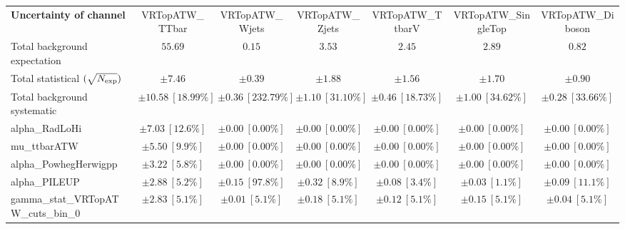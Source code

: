 
\begin{sidewaystable}
\begin{center}
\setlength{\tabcolsep}{0.0pc}
\begin{tabular*}{\textwidth}{@{\extracolsep{\fill}}lcccccc}
\noalign{\smallskip}\hline\noalign{\smallskip}
{\bf Uncertainty of channel}                                    & VRTopATW\_TTbar            & VRTopATW\_Wjets            & VRTopATW\_Zjets            & VRTopATW\_TtbarV            & VRTopATW\_SingleTop            & VRTopATW\_Diboson            \\
\noalign{\smallskip}\hline\noalign{\smallskip}
Total background expectation             &  $55.69$        &  $0.15$        &  $3.53$        &  $2.45$        &  $2.89$        &  $0.82$       \\
\noalign{\smallskip}\hline\noalign{\smallskip}
Total statistical $(\sqrt{N_{\rm exp}})$              & $\pm 7.46$        & $\pm 0.39$        & $\pm 1.88$        & $\pm 1.56$        & $\pm 1.70$        & $\pm 0.90$       \\
Total background systematic               & $\pm 10.58\ [18.99\%] $        & $\pm 0.36\ [232.79\%] $        & $\pm 1.10\ [31.10\%] $        & $\pm 0.46\ [18.73\%] $        & $\pm 1.00\ [34.62\%] $        & $\pm 0.28\ [33.66\%] $             \\
\noalign{\smallskip}\hline\noalign{\smallskip}
\noalign{\smallskip}\hline\noalign{\smallskip}
alpha\_RadLoHi         & $\pm 7.03\ [12.6\%] $          & $\pm 0.00\ [0.00\%] $          & $\pm 0.00\ [0.00\%] $          & $\pm 0.00\ [0.00\%] $          & $\pm 0.00\ [0.00\%] $          & $\pm 0.00\ [0.00\%] $       \\
mu\_ttbarATW         & $\pm 5.50\ [9.9\%] $          & $\pm 0.00\ [0.00\%] $          & $\pm 0.00\ [0.00\%] $          & $\pm 0.00\ [0.00\%] $          & $\pm 0.00\ [0.00\%] $          & $\pm 0.00\ [0.00\%] $       \\
alpha\_PowhegHerwigpp         & $\pm 3.22\ [5.8\%] $          & $\pm 0.00\ [0.00\%] $          & $\pm 0.00\ [0.00\%] $          & $\pm 0.00\ [0.00\%] $          & $\pm 0.00\ [0.00\%] $          & $\pm 0.00\ [0.00\%] $       \\
alpha\_PILEUP         & $\pm 2.88\ [5.2\%] $          & $\pm 0.15\ [97.8\%] $          & $\pm 0.32\ [8.9\%] $          & $\pm 0.08\ [3.4\%] $          & $\pm 0.03\ [1.1\%] $          & $\pm 0.09\ [11.1\%] $       \\
gamma\_stat\_VRTopATW\_cuts\_bin\_0         & $\pm 2.83\ [5.1\%] $          & $\pm 0.01\ [5.1\%] $          & $\pm 0.18\ [5.1\%] $          & $\pm 0.12\ [5.1\%] $          & $\pm 0.15\ [5.1\%] $          & $\pm 0.04\ [5.1\%] $       \\

\end{tabular*}
\end{center}
\end{sidewaystable}
